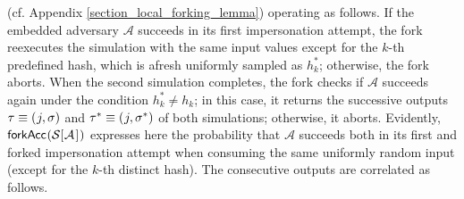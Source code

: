 \documentclass{iacrtrans}
\begin{document}
(cf. Appendix \ref{section_local_forking_lemma})
operating as follows.
If the embedded adversary $\mathcal{A}$
succeeds in its first
impersonation attempt,
the fork reexecutes the simulation
with the same input values except
for the $k$-th predefined hash,
which is afresh uniformly sampled as $h_k^*$;
otherwise, the fork aborts.
When the second simulation completes,
the fork checks if $\mathcal{A}$
succeeds again under the condition $h_k^* \neq h_k$;
in this case, it returns the successive outputs
$\tau \equiv (\hspace{0.5pt}j, \sigma)$
and $\tau^* \equiv (\hspace{0.5pt}j, \sigma^*)$
of both simulations; otherwise, it aborts.
Evidently,
$
\mathsf{forkAcc}
\hspace{0.5pt}
(
	\mathcal{S}
	[
		\hspace{0.5pt}
		\mathcal{A}
		\hspace{1pt}
	]
	\hspace{0.5pt}
)
$
expresses here the probability that $\mathcal{A}$
succeeds both in its first and forked impersonation attempt
when consuming the same uniformly random
input (except for the $k$-th distinct hash).
The consecutive outputs are correlated as follows.
\end{document}
